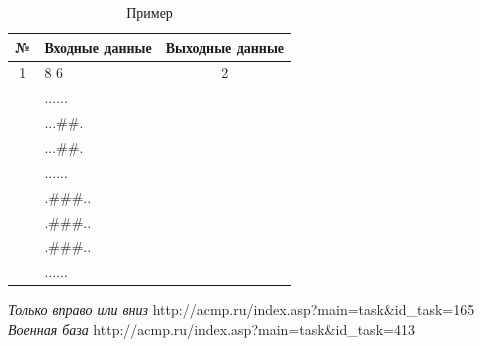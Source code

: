 \documentclass[12pt, twoside]{article}
\begin{document}
\begin{table}[h]
\begin{center}
\caption{Пример}
\begin{tabular}{|c|c|c|}
\hline
	 № &Входные данные& Выходные данные\\
	\hline
	
	1
	&
	\multicolumn{1}{|l|}{8 6}
	&
	2\\
	~
	&
	\multicolumn{1}{|l|}{......}
	&
	~\\
	~
	&
	\multicolumn{1}{|l|}{...\#\#.}
	&
	~\\
	~
	&
	\multicolumn{1}{|l|}{...\#\#.}
	&
	~\\
	~
	&
	\multicolumn{1}{|l|}{......}
	&
	~\\
	~
	&
	\multicolumn{1}{|l|}{.\#\#\#..}
	&
	~\\
	~
	&
	\multicolumn{1}{|l|}{.\#\#\#..}
	&
	~\\
	~
	&
	\multicolumn{1}{|l|}{.\#\#\#..}
	&
	~\\
	~
	&
	\multicolumn{1}{|l|}{......}
	&
	~\\
	\hline

\end{tabular}
\end{center}
\end{table}



\begin{thebibliography}{99}
	\textit{Только вправо или вниз} {http://acmp.ru/index.asp?main=task\&id\_task=165}
	\textit{Военная база} {http://acmp.ru/index.asp?main=task\&id\_task=413}
\end{thebibliography}
\end{document}
